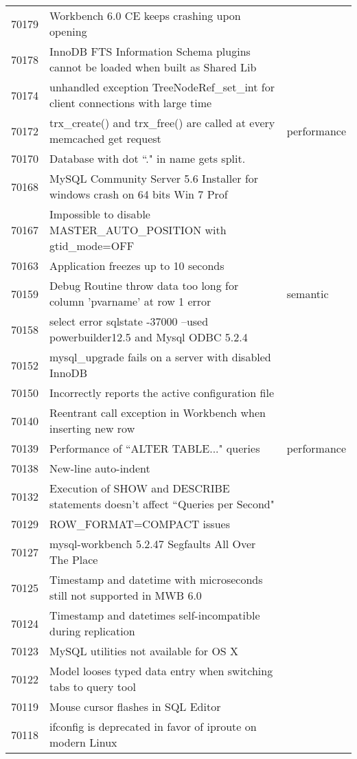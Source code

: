 \begin{longtable}[c]{p{1cm}p{8cm}p{3cm}}
70179 & Workbench 6.0 CE keeps crashing upon opening &  \\
70178 & InnoDB FTS Information Schema plugins cannot be loaded when built as Shared Lib &  \\
70174 & unhandled exception TreeNodeRef\_set\_int for client connections with large time &  \\
70172 & trx\_create() and trx\_free() are called at every memcached get request & performance \\
70170 & Database with dot ``." in name gets split. &  \\
70168 & MySQL Community Server 5.6 Installer for windows crash on 64 bits Win 7 Prof &  \\
70167 & Impossible to disable MASTER\_AUTO\_POSITION with gtid\_mode=OFF &  \\
70163 & Application freezes up to 10 seconds &  \\
70159 & Debug Routine throw data too long for column 'pvarname' at row 1 error & semantic \\
70158 & select error sqlstate -37000 --used powerbuilder12.5 and Mysql ODBC 5.2.4 &  \\
70152 & mysql\_upgrade fails on a server with disabled InnoDB &  \\
70150 & Incorrectly reports the active configuration file &  \\
70140 & Reentrant call exception in Workbench when inserting new row &  \\
70139 & Performance of ``ALTER TABLE..." queries & performance \\
70138 & New-line auto-indent &  \\
70132 & Execution of SHOW and DESCRIBE statements doesn't affect ``Queries per Second" &  \\
70129 & ROW\_FORMAT=COMPACT issues &  \\
70127 & mysql-workbench 5.2.47 Segfaults All Over The Place &  \\
70125 & Timestamp and datetime with microseconds still not supported in MWB 6.0 &  \\
70124 & Timestamp and datetimes self-incompatible during replication &  \\
70123 & MySQL utilities not available for OS X &  \\
70122 & Model looses typed data entry when switching tabs to query tool &  \\
70119 & Mouse cursor flashes in SQL Editor &  \\
70118 & ifconfig is deprecated in favor of iproute on modern Linux &  \\

\end{longtable}
